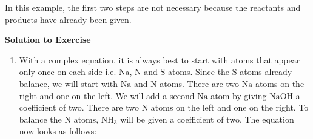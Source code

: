 {\begin{mdframed}[linewidth=4, leftmargin=40, rightmargin=40]
\begin{exercise}
      \par 
      \label{m38727*id66476}In this example, the first two steps are not necessary because the reactants and products have already been given.\par 
      
      \vspace{5pt}
      \label{m38727*solfhsst!!!underscore!!!id1143}\noindent\textbf{Solution to Exercise } \label{m38727*listfhsst!!!underscore!!!id1143}\begin{enumerate}[noitemsep, label=\textbf{Step} \textbf{\arabic*}. ] 
            \leftskip=20pt\rightskip=\leftskip\item  
      \label{m38727*id66518}With a complex equation, it is always best to start with atoms that appear only once on each side i.e. \begin{math}\mathrm{Na}\end{math}, \begin{math}\mathrm{N}\end{math} and \begin{math}\mathrm{S}\end{math} atoms. Since the \begin{math}\mathrm{S}\end{math} atoms already balance, we will start with \begin{math}\mathrm{Na}\end{math} and \begin{math}\mathrm{N}\end{math} atoms. There are two \begin{math}\mathrm{Na}\end{math} atoms on the right and one on the left. We will add a second \begin{math}\mathrm{Na}\end{math} atom by giving \begin{math}\mathrm{NaOH}\end{math} a coefficient of two. There are two \begin{math}\mathrm{N}\end{math} atoms on the left and one on the right. To balance the \begin{math}\mathrm{N}\end{math} atoms, \begin{math}\mathrm{NH}{}_{3}\end{math} will be given a coefficient of two. The equation now looks as follows:
      \label{m38727*id66539}\nopagebreak\noindent{}
      \settowidth{\mymathboxwidth}{\begin{equation}

\end{equation}}
\end{enumerate}
\end{exercise}
\end{mdframed}}
